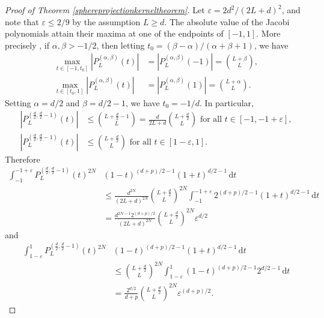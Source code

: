 \documentclass[11pt,a4paper]{article}
\theoremstyle{definition}
\begin{document}
\begin{proof}[Proof of Theorem \ref{sphereprojectionkerneltheorem}]
Let $\varepsilon = 2d^2/(2L+d)^2$, and note that $\varepsilon \le 2/9$ by the assumption $L \ge d$. The absolute value of the Jacobi polynomials attain their maxima at one of the endpoints of $[-1,1]$. More precisely \cite[p.\ 168]{SZ}, if $\alpha, \beta >-1/2$, then letting $t_0=(\beta-\alpha)/(\alpha+\beta+1)$, we have
\[ \begin{split} \max_{t \in [-1, t_0]} |P_L^{(\alpha, \beta)}(t)|&=|P_L^{(\alpha, \beta)}(-1)|=\binom{L+\beta}{L}, \\ \max_{t \in [t_0,1]} |P_L^{(\alpha, \beta)}(t)|&=|P_L^{(\alpha, \beta)}(1)|=\binom{L+\alpha}{L} . \end{split} \]
Setting $\alpha=d/2$ and $\beta=d/2-1$, we have $t_0=-1/d$. In particular,
\[ \begin{split} |P_L^{(\frac{d}{2}, \frac{d}{2}-1)}(t)| &\le \binom{L+\frac{d}{2}-1}{L} = \frac{d}{2L+d} \binom{L+\frac{d}{2}}{L} \textrm{ for all } t \in [-1, -1+\varepsilon], \\ |P_L^{(\frac{d}{2}, \frac{d}{2}-1)}(t)| &\le \binom{L+\frac{d}{2}}{L} \textrm{ for all } t \in [1-\varepsilon, 1] . \end{split} \]
Therefore
\begin{equation}\label{near-1}
\begin{split} \int_{-1}^{-1+\varepsilon} P_L^{(\frac{d}{2}, \frac{d}{2}-1)}(t)^{2N} &(1-t)^{(d+p)/2-1}(1+t)^{d/2-1} \, \mathrm{d}t \\ &\le \frac{d^{2N}}{(2L+d)^{2N}} \binom{L+\frac{d}{2}}{L}^{2N} \int_{-1}^{-1+\varepsilon} 2^{(d+p)/2-1} (1+t)^{d/2-1} \, \mathrm{d}t \\ &= \frac{d^{2N-1}2^{(d+p)/2}}{(2L+d)^{2N}} \binom{L+\frac{d}{2}}{L}^{2N} \varepsilon^{d/2} \end{split}
\end{equation}
and
\begin{equation}\label{near1}
\begin{split} \int_{1-\varepsilon}^1 P_L^{(\frac{d}{2}, \frac{d}{2}-1)}(t)^{2N} &(1-t)^{(d+p)/2-1}(1+t)^{d/2-1} \, \mathrm{d}t \\ &\le \binom{L+\frac{d}{2}}{L}^{2N} \int_{1-\varepsilon}^1 (1-t)^{(d+p)/2-1} 2^{d/2-1} \, \mathrm{d}t \\ &= \frac{2^{d/2}}{d+p} \binom{L+\frac{d}{2}}{L}^{2N} \varepsilon^{(d+p)/2} . \end{split}
\end{equation}


\end{proof}
\end{document}
